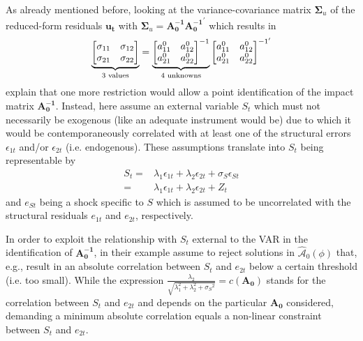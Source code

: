 \documentclass[a4paper,11pt,listof=nochaptergap,oneside,pointednumbers,bibtotoc,bigheadings,liststotoc,hidelinks]{scrbook}
\theoremstyle{mysatz}
\theoremstyle{mydefinition}
\theoremstyle{mytheorem}
\theoremstyle{mybemerkung}
\let\oldhat\hat
\newcommand{\vect}[1]{\boldsymbol{\mathbf{#1}}}
\newcommand{\hatt}[1]{\oldhat{\boldsymbol{\mathbf{#1}}}}
\begin{document}
As already mentioned before, looking at the variance-covariance matrix $\vect{\Sigma}_u$ of the reduced-form residuals $\vect{u_t}$ with $\vect{\Sigma}_u = \vect{A_{0}^{-1}} \vect{A_{0}^{-1}}^'$ which results in 
$$		
		\underbrace{%
		\begin{bmatrix}
    		\sigma_{11} & \sigma_{12} \\
		\sigma_{21} & \sigma_{22}
 		\end{bmatrix}
}_{\text{3 values}} = \underbrace{%
		\begin{bmatrix}
    		a_{11}^0 & a_{12}^0 \\
		a_{21}^0 & a_{22}^0
 		\end{bmatrix}^{-1}
}_{\text{4 unknowns}}
\begin{bmatrix}
    		a_{11}^0 & a_{12}^0  \\
		a_{21}^0 & a_{22}^0
 		\end{bmatrix}^{{-1}'}$$
\citet{ludvigsonetal:17} explain that one more restriction would allow a point identification of the impact matrix $ \vect{A_{0}^{-1}}$. Instead, here \citet{ludvigsonetal:17} assume an external variable $S_t$ which must not necessarily be exogenous (like an adequate instrument would be) due to which it would be contemporaneously correlated with at least one of the structural errors $\epsilon_{1t}$ and/or $\epsilon_{2t}$ (i.e. endogenous). These assumptions translate into $S_t$ being representable by 
	\begin{equation} \label{eq:svar_ludvig1}
		\begin{split}
	S_t =&  \lambda_1 \epsilon_{1t} + \lambda_2 \epsilon_{2t} + \sigma_S \epsilon_{St} \\
	     = & 	\lambda_1 \epsilon_{1t} + \lambda_2 \epsilon_{2t} + Z_t		
	     	\end{split}				
	\end{equation}	
and $e_{St}$ being a shock specific to $S$ which is assumed to be uncorrelated with the structural residuals $e_{1t}$ and $e_{2t}$, respectively. 

In order to exploit the relationship with $S_t$ external to the VAR in the identification of $ \vect{A_{0}^{-1}}$, in their example \citet{ludvigsonetal:17} assume to reject solutions in $\hatt{\mathcal{A}}_0(\phi)$ that, e.g., result in an absolute correlation between $S_t$ and $e_{2t}$ below a certain threshold (i.e. too small). While the expression $\frac{\lambda_2}{\sqrt{\lambda_{1}^2 + \lambda_{2}^2 + \sigma_S{^2}}} = c(\vect{A_0})$ stands for the correlation between $S_t$ and $e_{2t}$ and depends on the particular $\vect{A_0}$ considered, demanding a minimum absolute correlation equals a non-linear constraint between $S_t$ and $e_{2t}$.\\
\end{document}
